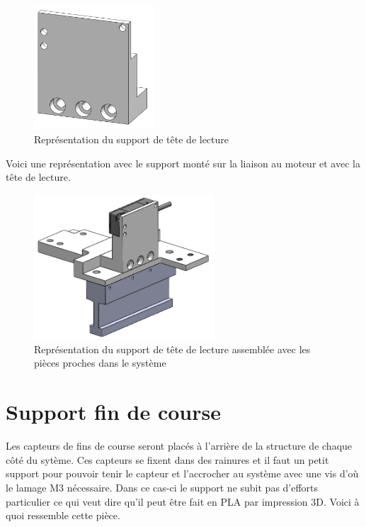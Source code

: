 \begin{figure}[H]
    \centering
    \includegraphics[width = 0.4\textwidth]{assets/figures/SupportTeteLecture.png}
    \caption{Représentation du support de tête de lecture}
    \label{fig:SupTeteLect}
\end{figure}

Voici une représentation avec le support monté sur la liaison au moteur et avec la tête de lecture.

\begin{figure}[H]
    \centering
    \includegraphics[width = 0.6\textwidth]{assets/figures/AssemblageMesureLineaire.png}
    \caption{Représentation du support de tête de lecture assemblée avec les pièces proches dans le système}
    \label{fig:AssMesLin}
\end{figure}

\section{Support fin de course}\label{sec:SupFinCourse}
Les capteurs de fins de course seront placés à l'arrière de la structure de chaque côté du sytème. Ces capteurs se fixent dans des rainures et
il faut un petit support pour pouvoir tenir le capteur et l'accrocher au système avec une vis d'où le lamage M3 nécessaire. Dans ce cas-ci le support ne subit pas d'efforts particulier
ce qui veut dire qu'il peut être fait en \acrshort{PLA} par impression 3D. Voici à quoi ressemble cette pièce.

